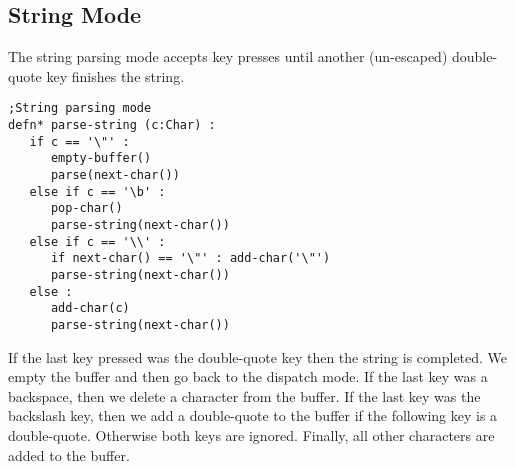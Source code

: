 \documentclass[10pt,oneside]{book}
\begin{document}
\subsection*{String Mode}
The string parsing mode accepts key presses until another (un-escaped) double-quote key finishes the string.
\begin{lstlisting}
;String parsing mode
defn* parse-string (c:Char) :
   if c == '\"' :
      empty-buffer()
      parse(next-char())
   else if c == '\b' :
      pop-char()
      parse-string(next-char())
   else if c == '\\' :
      if next-char() == '\"' : add-char('\"')
      parse-string(next-char())
   else :
      add-char(c)
      parse-string(next-char())
\end{lstlisting}
If the last key pressed was the double-quote key then the string is completed. We empty the buffer and then go back to the dispatch mode. If the last key was a backspace, then we delete a character from the buffer. If the last key was the backslash key, then we add a double-quote to the buffer if the following key is a double-quote. Otherwise both keys are ignored. Finally, all other characters are added to the buffer.
\end{document}

